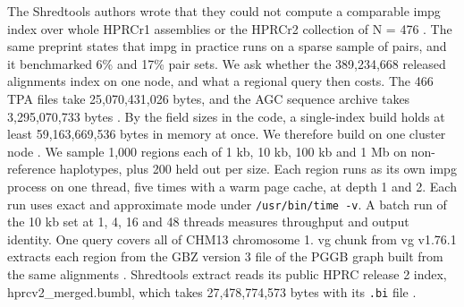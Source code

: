 The Shredtools authors wrote that they could not compute a comparable impg index over whole HPRCr1 assemblies or the HPRCr2 collection of N = 476 \citep{Shivakumar2026shredtools}.
The same preprint states that impg in practice runs on a sparse sample of pairs, and it benchmarked 6\% and 17\% pair sets.
We ask whether the 389,234,668 released alignments index on one node, and what a regional query then costs.
The 466 TPA files take 25,070,431,026 bytes, and the AGC sequence archive takes 3,295,070,733 bytes \citep{Deorowicz2023agc}.
By the field sizes in the code, a single-index build holds at least 59,163,669,536 bytes in memory at once.
We therefore build on one cluster node .
We sample 1,000 regions each of 1 kb, 10 kb, 100 kb and 1 Mb on non-reference haplotypes, plus 200 held out per size.
Each region runs as its own impg process on one thread, five times with a warm page cache, at depth 1 and 2.
Each run uses exact and approximate mode under \texttt{/usr/bin/time -v}.
A batch run of the 10 kb set at 1, 4, 16 and 48 threads measures throughput and output identity.
One query covers all of CHM13 chromosome 1.
vg chunk from vg v1.76.1 extracts each region from the GBZ version 3 file of the PGGB graph built from the same alignments \citep{Garrison2018vg,Siren2022gbz,Garrison2024pggb} .
Shredtools extract reads its public HPRC release 2 index, hprcv2\_merged.bumbl, which takes 27,478,774,573 bytes with its \texttt{.bi} file \citep{Shivakumar2026shredtools,Shivakumar2025mumemto}.
